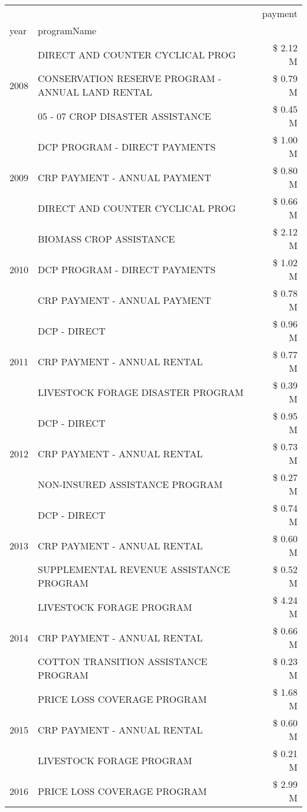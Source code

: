 \begin{tabular}{llr}
\toprule
 &  & payment \\
year & programName &  \\
\midrule
\multirow[t]{3}{*}{2008} & DIRECT AND COUNTER CYCLICAL PROG & \$ 2.12 M \\
 & CONSERVATION RESERVE PROGRAM - ANNUAL LAND RENTAL & \$ 0.79 M \\
 & 05 - 07 CROP DISASTER ASSISTANCE & \$ 0.45 M \\
\cline{1-3}
\multirow[t]{3}{*}{2009} & DCP PROGRAM - DIRECT PAYMENTS & \$ 1.00 M \\
 & CRP PAYMENT - ANNUAL PAYMENT & \$ 0.80 M \\
 & DIRECT AND COUNTER CYCLICAL PROG & \$ 0.66 M \\
\cline{1-3}
\multirow[t]{3}{*}{2010} & BIOMASS CROP ASSISTANCE & \$ 2.12 M \\
 & DCP PROGRAM - DIRECT PAYMENTS & \$ 1.02 M \\
 & CRP PAYMENT - ANNUAL PAYMENT & \$ 0.78 M \\
\cline{1-3}
\multirow[t]{3}{*}{2011} & DCP - DIRECT & \$ 0.96 M \\
 & CRP PAYMENT - ANNUAL RENTAL & \$ 0.77 M \\
 & LIVESTOCK FORAGE DISASTER PROGRAM & \$ 0.39 M \\
\cline{1-3}
\multirow[t]{3}{*}{2012} & DCP - DIRECT & \$ 0.95 M \\
 & CRP PAYMENT - ANNUAL RENTAL & \$ 0.73 M \\
 & NON-INSURED ASSISTANCE PROGRAM & \$ 0.27 M \\
\cline{1-3}
\multirow[t]{3}{*}{2013} & DCP - DIRECT & \$ 0.74 M \\
 & CRP PAYMENT - ANNUAL RENTAL & \$ 0.60 M \\
 & SUPPLEMENTAL REVENUE ASSISTANCE PROGRAM & \$ 0.52 M \\
\cline{1-3}
\multirow[t]{3}{*}{2014} & LIVESTOCK FORAGE PROGRAM & \$ 4.24 M \\
 & CRP PAYMENT - ANNUAL RENTAL & \$ 0.66 M \\
 & COTTON TRANSITION ASSISTANCE PROGRAM & \$ 0.23 M \\
\cline{1-3}
\multirow[t]{3}{*}{2015} & PRICE LOSS COVERAGE PROGRAM & \$ 1.68 M \\
 & CRP PAYMENT - ANNUAL RENTAL & \$ 0.60 M \\
 & LIVESTOCK FORAGE PROGRAM & \$ 0.21 M \\
\cline{1-3}
\multirow[t]{3}{*}{2016} & PRICE LOSS COVERAGE PROGRAM                   & \$ 2.99 M \\

\end{tabular}
